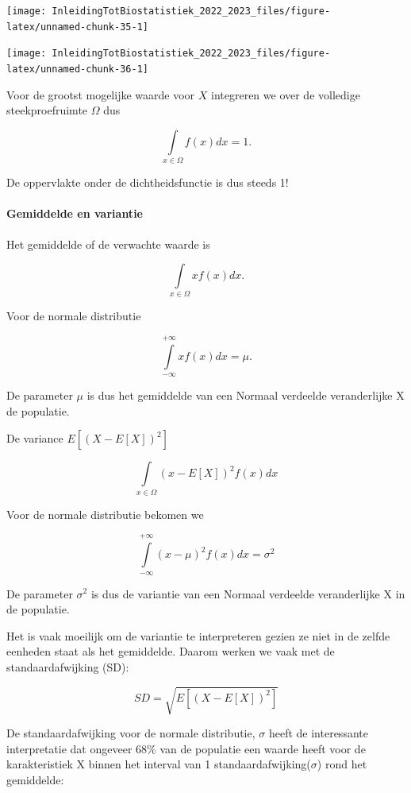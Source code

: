 \documentclass[
  12pt,dutch,coursenotes]{book}
\begin{document}
\begin{center}\texttt{[image: InleidingTotBiostatistiek\_2022\_2023\_files/figure-latex/unnamed-chunk-35-1]} \end{center}

\begin{center}\texttt{[image: InleidingTotBiostatistiek\_2022\_2023\_files/figure-latex/unnamed-chunk-36-1]} \end{center}

Voor de grootst mogelijke waarde voor \(X\) integreren we over de volledige steekproefruimte \(\Omega\) dus

\[\int \limits_{x \in \Omega} f(x) dx=1.\]

De oppervlakte onder de dichtheidsfunctie is dus steeds 1!

\hypertarget{gemiddelde-en-variantie}{%
\paragraph{Gemiddelde en variantie}\label{gemiddelde-en-variantie}}

Het gemiddelde of de verwachte waarde is

\[\int \limits_{x \in \Omega} x f(x) dx.\]

Voor de normale distributie

\[\int \limits_{-\infty}^{+\infty} x f(x) dx = \mu.\]

De parameter \(\mu\) is dus het gemiddelde van een Normaal verdeelde veranderlijke X de populatie.

De variance \(E[(X-E[X])^2]\)

\[\int \limits_{x \in \Omega} (x-E[X])^2 f(x) dx\]

Voor de normale distributie bekomen we

\[\int \limits_{-\infty}^{+\infty} (x-\mu)^2 f(x) dx = \sigma^2\]

De parameter \(\sigma^2\) is dus de variantie van een Normaal verdeelde veranderlijke X in de populatie.

Het is vaak moeilijk om de variantie te interpreteren gezien ze niet in de zelfde eenheden staat als het gemiddelde. Daarom werken we vaak met de standaardafwijking (SD):

\[SD=\sqrt{E[(X-E[X])^2]}\]

De standaardafwijking voor de normale distributie, \(\sigma\) heeft de interessante interpretatie dat ongeveer 68\% van de populatie een waarde heeft voor de karakteristiek X binnen het interval van 1 standaardafwijking(\(\sigma\)) rond het gemiddelde:
\end{document}
